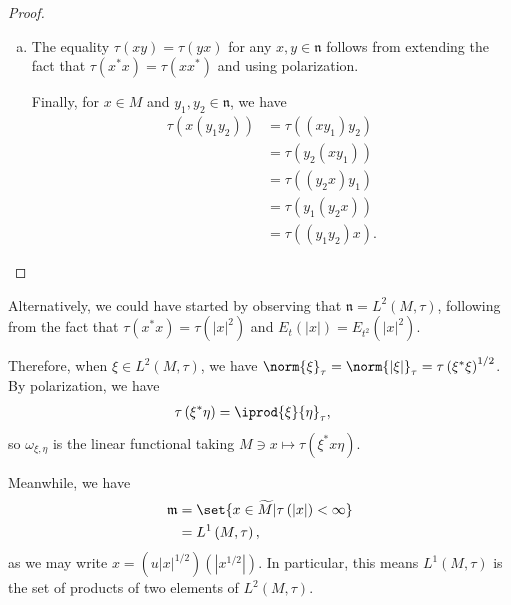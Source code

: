 \documentclass[10pt]{mypackage}
\begin{document}
\begin{proof}
\begin{enumerate}[(a)]
      Since $\tau$ is additive on $ \widetilde{M}_{+} $, then this definition is not ambiguous. Moreover, the extension is linear and self-adjoint.
    \item The equality $\tau\left( xy \right) = \tau\left( yx \right)$ for any $x,y\in \mathfrak{n}$ follows from extending the fact that $\tau\left( x^{\ast}x \right) = \tau\left( xx^{\ast} \right)$ and using polarization.

      Finally, for $x\in M$ and $y_1,y_2\in \mathfrak{n}$, we have
      \begin{align*}
        \tau\left( x\left( y_1y_2 \right) \right) &= \tau\left( \left( xy_1 \right)y_2 \right)\\
                                                  &= \tau\left( y_2\left( xy_1 \right) \right)\\
                                                  &= \tau\left( \left( y_2 x \right)y_1 \right)\\
                                                  &= \tau\left( y_1\left( y_2 x \right) \right)\\
                                                  &= \tau\left( \left( y_1y_2 \right)x \right).
      \end{align*}
  \end{enumerate}
\end{proof}
Alternatively, we could have started by observing that $ \mathfrak{n} = L^2\left( M,\tau \right) $, following from the fact that $\tau\left( x^{\ast}x \right) = \tau\left( \left\vert x \right\vert^2 \right)$ and $E_t\left( \left\vert x \right\vert \right) = E_{t^2}\left( \left\vert x \right\vert^2 \right)$.

Therefore, when $\xi\in L^2\left( M,\tau \right)$, we have $\norm{\xi}_{\tau} = \norm{\left\vert \xi \right\vert}_{\tau} = \tau\left( \xi^{\ast}\xi \right)^{1/2}$. By polarization, we have
\begin{align*}
  \tau\left( \xi^{\ast}\eta \right) &= \iprod{\xi}{\eta}_{\tau},
\end{align*}
so $\omega_{\xi,\eta}$ is the linear functional taking $M\ni x\mapsto \tau\left( \xi^{\ast}x \eta \right)$.

Meanwhile, we have
\begin{align*}
  \mathfrak{m} &= \set{x\in \widetilde{M} | \tau\left( \left\vert x \right\vert \right) < \infty}\\
               &= L^1\left( M,\tau \right),
\end{align*}
as we may write $x = \left( u\left\vert x \right\vert^{1/2} \right)\left( \left\vert x^{1/2} \right\vert \right)$. In particular, this means $L^1\left( M,\tau \right)$ is the set of products of two elements of $L^2\left( M,\tau \right)$.
\end{document}
